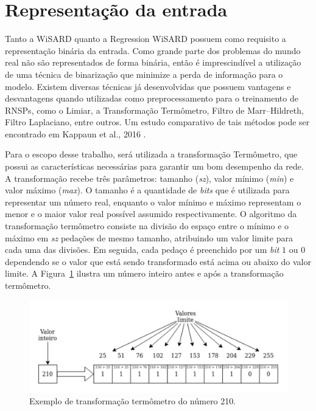 \section{Representação da entrada} \label{sec:input_repr}
Tanto a WiSARD quanto a Regression WiSARD possuem como requisito a representação binária da entrada. Como grande parte dos problemas do mundo real não são representados de forma binária, então é imprescindível a utilização de uma técnica de binarização que minimize a perda de informação para o modelo. Existem diversas técnicas já desenvolvidas que possuem vantagens e desvantagens quando utilizadas como preprocessamento para o treinamento de RNSPs, como o Limiar, a Transformação Termômetro, Filtro de Marr–Hildreth, Filtro Laplaciano, entre outros. Um estudo comparativo de tais métodos pode ser encontrado em Kappaun et al., 2016 \cite{binenctec}.

Para o escopo desse trabalho, será utilizada a transformação Termômetro, que possui as características necessárias para garantir um bom desempenho da rede. A transformação recebe três parâmetros: tamanho (\textit{sz}), valor mínimo (\textit{min}) e valor máximo (\textit{max}). O tamanho é a quantidade de \textit{bits} que é utilizada para representar um número real, enquanto o valor mínimo e máximo representam o menor e o maior valor real possível assumido respectivamente. O algoritmo da transformação termômetro consiste na divisão do espaço entre o mínimo e o máximo em \textit{sz} pedações de mesmo tamanho, atribuindo um valor limite para cada uma das divisões. Em seguida, cada pedaço é preenchido por um \textit{bit} $1$ ou $0$ dependendo se o valor que está sendo transformado está acima ou abaixo do valor limite. A Figura~\ref{fig:therm_ex} ilustra um número inteiro antes e após a transformação termômetro.

\begin{figure}[!htp]
    \centering
    \includegraphics[width=5.0in]{img/therm_example.pdf}
    \caption{Exemplo de transformação termômetro do número 210.}
    \label{fig:therm_ex}
\end{figure}

